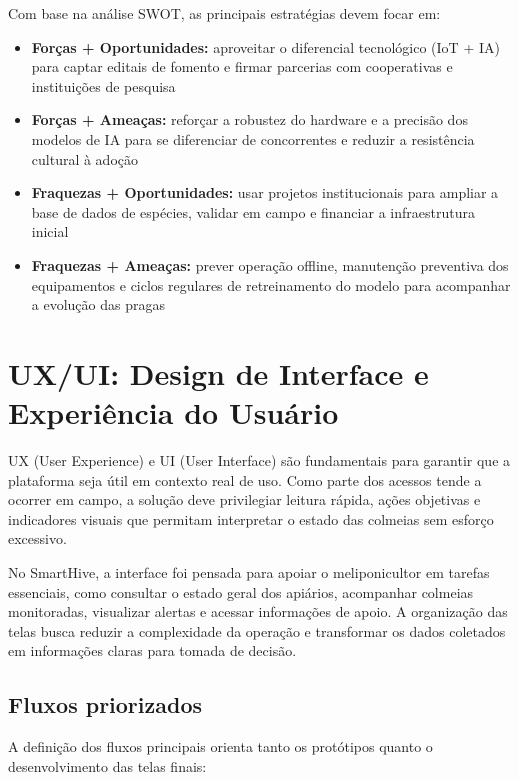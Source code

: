 \documentclass[11pt,a4paper]{article}
\begin{document}
Com base na análise SWOT, as principais estratégias devem focar em:
\begin{itemize}
    \item \textbf{Forças + Oportunidades:} aproveitar o diferencial tecnológico (IoT + IA) para captar editais de fomento e firmar parcerias com cooperativas e instituições de pesquisa
    \item \textbf{Forças + Ameaças:} reforçar a robustez do hardware e a precisão dos modelos de IA para se diferenciar de concorrentes e reduzir a resistência cultural à adoção
    \item \textbf{Fraquezas + Oportunidades:} usar projetos institucionais para ampliar a base de dados de espécies, validar em campo e financiar a infraestrutura inicial
    \item \textbf{Fraquezas + Ameaças:} prever operação offline, manutenção preventiva dos equipamentos e ciclos regulares de retreinamento do modelo para acompanhar a evolução das pragas
\end{itemize}



\section{UX/UI: Design de Interface e Experiência do Usuário}

UX (User Experience) e UI (User Interface) \cite{silva2025} são fundamentais para garantir que a plataforma seja útil em contexto real de uso. Como parte dos acessos tende a ocorrer em campo, a solução deve privilegiar leitura rápida, ações objetivas e indicadores visuais que permitam interpretar o estado das colmeias sem esforço excessivo.

No SmartHive, a interface foi pensada para apoiar o meliponicultor em tarefas essenciais, como consultar o estado geral dos apiários, acompanhar colmeias monitoradas, visualizar alertas e acessar informações de apoio. A organização das telas busca reduzir a complexidade da operação e transformar os dados coletados em informações claras para tomada de decisão.

\subsection{Fluxos priorizados}

A definição dos fluxos principais orienta tanto os protótipos quanto o desenvolvimento das telas finais:
\end{document}
